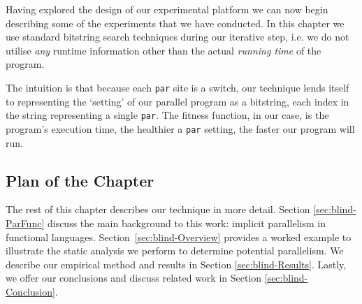 Having explored the design of our experimental platform we can now begin
describing some of the experiments that we have conducted. In this chapter we
use standard bitstring search techniques during our iterative step, i.e. we do
not utilise \emph{any} runtime information other than the actual \emph{running
time} of the program.

The intuition is that because each \verb|par| site is a switch, our technique
lends itself to representing the `setting' of our parallel program as a
bitstring, each index in the string representing a single \verb|par|. The
fitness function, in our case, is the program's execution time, the healthier a
\verb|par| setting, the faster our program will run.

\subsection*{Plan of the Chapter}

The rest of this chapter describes our technique in more detail. Section
\ref{sec:blind-ParFunc} discuss the main background to this work: implicit
parallelism in functional languages. Section~\ref{sec:blind-Overview} provides
a worked example to illustrate the static analysis we perform to determine
potential parallelism.  We describe our empirical method and results in Section
\ref{sec:blind-Results}. Lastly, we offer our conclusions and discuss related
work in Section \ref{sec:blind-Conclusion}.
